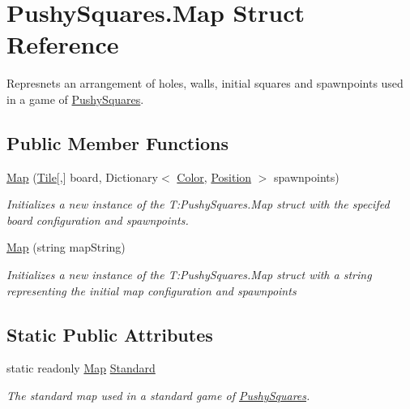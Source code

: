 \hypertarget{struct_pushy_squares_1_1_map}{}\section{Pushy\+Squares.\+Map Struct Reference}
\label{struct_pushy_squares_1_1_map}


Represnets an arrangement of holes, walls, initial squares and spawnpoints used in a game of \hyperlink{namespace_pushy_squares}{Pushy\+Squares}.  


\subsection*{Public Member Functions}
\begin{DoxyCompactItemize}
\item 
\hyperlink{struct_pushy_squares_1_1_map_aa1b0c05acd50a2f77f48f6d07de19afb}{Map} (\hyperlink{namespace_pushy_squares_a99b558ed55fb7c5c20e9fe37c652132c}{Tile}\mbox{[},\mbox{]} board, Dictionary$<$ \hyperlink{namespace_pushy_squares_a456c990da0c8e2089c171d31f7e27574}{Color}, \hyperlink{struct_pushy_squares_1_1_position}{Position} $>$ spawnpoints)
\begin{DoxyCompactList}\small\item\em Initializes a new instance of the T\+:\+Pushy\+Squares.\+Map struct with the specifed board configuration and spawnpoints. \end{DoxyCompactList}\item 
\hyperlink{struct_pushy_squares_1_1_map_a2bc179f99cc9b1d592a249a3dc83e2c4}{Map} (string map\+String)
\begin{DoxyCompactList}\small\item\em Initializes a new instance of the T\+:\+Pushy\+Squares.\+Map struct with a string representing the initial map configuration and spawnpoints \end{DoxyCompactList}\end{DoxyCompactItemize}
\subsection*{Static Public Attributes}
\begin{DoxyCompactItemize}
\item 
static readonly \hyperlink{struct_pushy_squares_1_1_map}{Map} \hyperlink{struct_pushy_squares_1_1_map_aae0947b0379bf76f1a7df5e7c48344fe}{Standard}
\begin{DoxyCompactList}\small\item\em The standard map used in a standard game of \hyperlink{namespace_pushy_squares}{Pushy\+Squares}. \end{DoxyCompactList}\end{DoxyCompactItemize}
